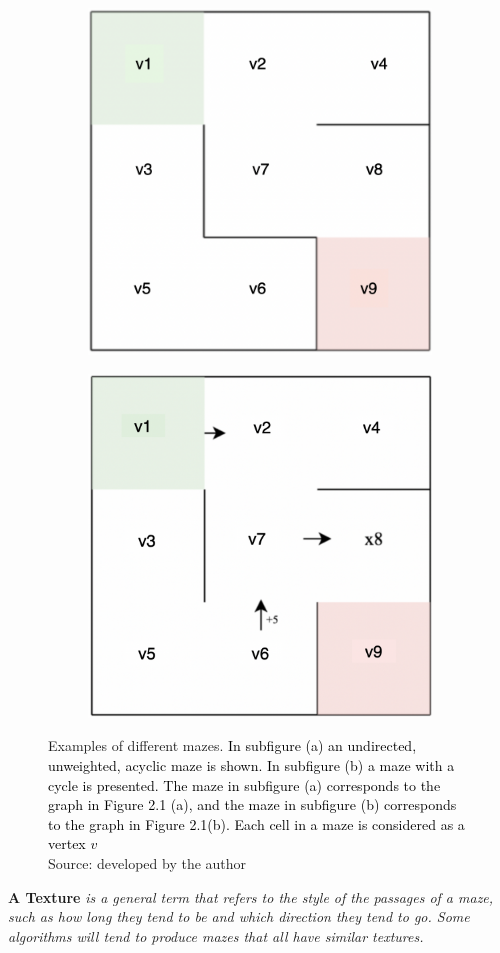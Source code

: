  \begin{figure}[!h]
	\centering
	\begin{subfigure}{.45\textwidth}
	  \centering
	  \includegraphics[width=.6\linewidth]{undirectedmaze}
	  \caption{}
	  \label{fig:sub1}
	\end{subfigure}
	\begin{subfigure}{.45\textwidth}
	  \centering
	  \includegraphics[width=.6\linewidth]{cyclicmaze}
	  \caption{}
	  \label{fig:sub2}
	\end{subfigure}
	\caption{Examples of different mazes. \textcolor{black}{In subfigure (a) an undirected, unweighted, acyclic maze is shown. In subfigure (b) a maze with a cycle is presented. The maze in subfigure (a) corresponds to the graph in Figure 2.1 (a), and the maze in subfigure (b) corresponds to the graph in Figure 2.1(b). Each cell in a maze is considered as a vertex $v$}\\Source: developed by the author}
	\label{fig:test}
	\end{figure}	
 \begin{definition}\textbf{A Texture} \emph{is a general term that refers to the style of the passages of a maze, such as how long they tend to be and which direction they tend to go. Some algorithms will tend to produce mazes that all have similar textures.\cite{Buck}}\end{definition}
